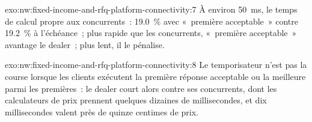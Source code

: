 \begin{solution}{exo:nw:fixed-income-and-rfq-platform-connectivity:7}
À environ \qty{50}{\milli\second}, le temps de calcul propre aux concurrents~: 19.0~\% avec «~première acceptable~» contre 19.2~\% à l'échéance~; plus rapide
que les concurrents, «~première acceptable~» avantage le dealer~; plus lent, il le pénalise.
\end{solution}

\begin{solution}{exo:nw:fixed-income-and-rfq-platform-connectivity:8}
Le temporisateur n'est pas la course lorsque les clients exécutent la première réponse acceptable ou la meilleure parmi les premières~: le dealer court alors contre
ses concurrents, dont les calculateurs de prix prennent quelques dizaines de millisecondes, et dix millisecondes valent près de quinze centimes de prix.
\end{solution}


